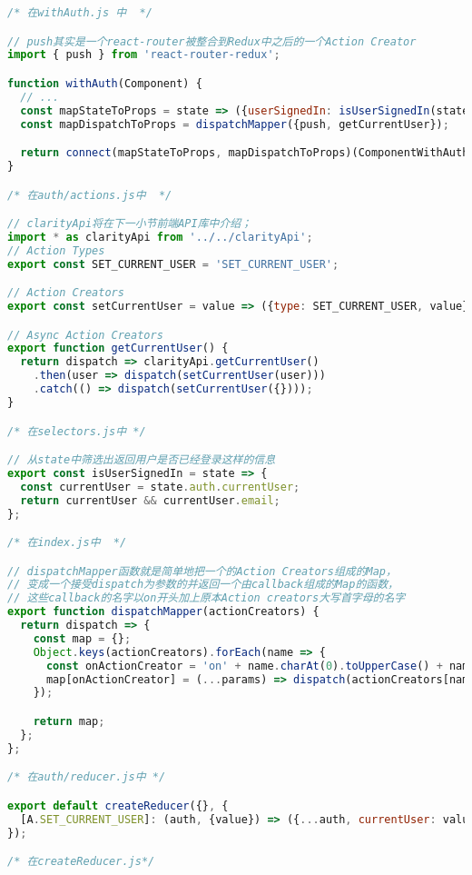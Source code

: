 \begin{lstlisting}[language={JavaScript}, caption={Smart City模块权限校验Redux数据流相关代码}]
/* 在withAuth.js 中  */

// push其实是一个react-router被整合到Redux中之后的一个Action Creator
import { push } from 'react-router-redux';

function withAuth(Component) {
  // ...
  const mapStateToProps = state => ({userSignedIn: isUserSignedIn(state)});
  const mapDispatchToProps = dispatchMapper({push, getCurrentUser});

  return connect(mapStateToProps, mapDispatchToProps)(ComponentWithAuth);
}

/* 在auth/actions.js中  */

// clarityApi将在下一小节前端API库中介绍；
import * as clarityApi from '../../clarityApi';
// Action Types
export const SET_CURRENT_USER = 'SET_CURRENT_USER';

// Action Creators
export const setCurrentUser = value => ({type: SET_CURRENT_USER, value});

// Async Action Creators
export function getCurrentUser() {
  return dispatch => clarityApi.getCurrentUser()
    .then(user => dispatch(setCurrentUser(user)))
    .catch(() => dispatch(setCurrentUser({})));
}

/* 在selectors.js中 */

// 从state中筛选出返回用户是否已经登录这样的信息
export const isUserSignedIn = state => {
  const currentUser = state.auth.currentUser;
  return currentUser && currentUser.email;
};

/* 在index.js中  */

// dispatchMapper函数就是简单地把一个的Action Creators组成的Map，
// 变成一个接受dispatch为参数的并返回一个由callback组成的Map的函数，
// 这些callback的名字以on开头加上原本Action creators大写首字母的名字
export function dispatchMapper(actionCreators) {
  return dispatch => {
    const map = {};
    Object.keys(actionCreators).forEach(name => {
      const onActionCreator = 'on' + name.charAt(0).toUpperCase() + name.slice(1);
      map[onActionCreator] = (...params) => dispatch(actionCreators[name](...params));
    });

    return map;
  };
};

/* 在auth/reducer.js中 */

export default createReducer({}, {
  [A.SET_CURRENT_USER]: (auth, {value}) => ({...auth, currentUser: value}),
});

/* 在createReducer.js*/


\end{lstlisting}
